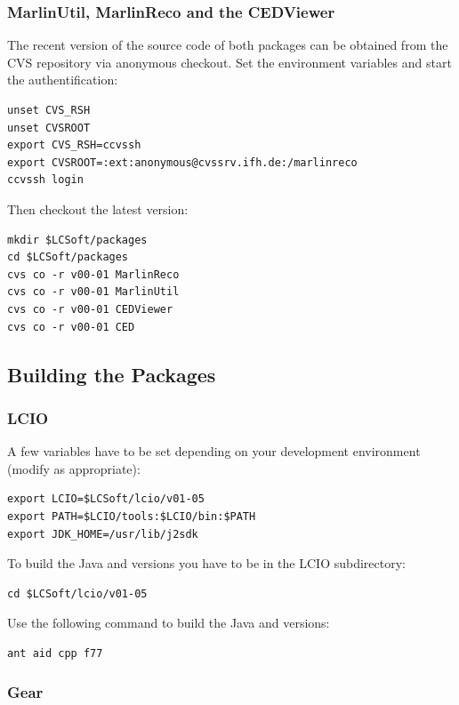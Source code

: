 \subsubsection*{MarlinUtil, MarlinReco and the CEDViewer}

The recent version of the source code of both packages can be 
obtained from the CVS repository via anonymous checkout.
Set the environment variables and start the authentification: 

\begin{verbatim}
unset CVS_RSH
unset CVSROOT
export CVS_RSH=ccvssh 
export CVSROOT=:ext:anonymous@cvssrv.ifh.de:/marlinreco
ccvssh login
\end{verbatim}

Then checkout the latest version: 

\begin{verbatim}
mkdir $LCSoft/packages 
cd $LCSoft/packages 
cvs co -r v00-01 MarlinReco 
cvs co -r v00-01 MarlinUtil 
cvs co -r v00-01 CEDViewer 
cvs co -r v00-01 CED 
\end{verbatim}

\subsection{Building the Packages}

\subsubsection*{LCIO}

A few variables have to be set depending on your development
environment (modify as appropriate):

\begin{verbatim}
export LCIO=$LCSoft/lcio/v01-05 
export PATH=$LCIO/tools:$LCIO/bin:$PATH 
export JDK_HOME=/usr/lib/j2sdk
\end{verbatim}

To build the Java and \CPP{} versions you have to be in the LCIO subdirectory:

\begin{verbatim}
cd $LCSoft/lcio/v01-05
\end{verbatim}

Use the following command to build the Java and \CPP{} versions:

\begin{verbatim}
ant aid cpp f77 
\end{verbatim}

\subsubsection*{Gear}

